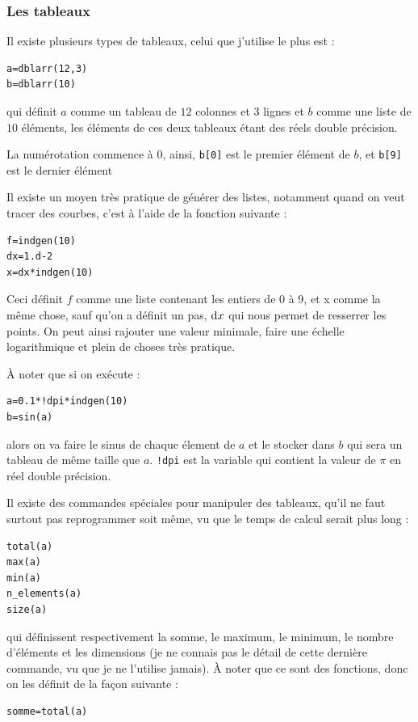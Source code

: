 \documentclass[a4paper,twoside]{article}
\begin{document}
\subsubsection{Les tableaux}
Il existe plusieurs types de tableaux, celui que j'utilise le plus est :
\begin{verbatim}
a=dblarr(12,3)
b=dblarr(10)
\end{verbatim}
qui définit $a$ comme un tableau de $12$ colonnes et $3$ lignes et $b$ comme une liste de $10$ éléments, les éléments de ces deux tableaux étant des réels double précision.

\begin{attention}
La numérotation commence à $0$, ainsi, \verb|b[0]| est le premier élément de $b$, et \verb|b[9]| est le dernier élément
\end{attention}

\bigskip

Il existe un moyen très pratique de générer des listes, notamment quand on veut tracer des courbes, c'est à l'aide de la fonction suivante :
\begin{verbatim}
f=indgen(10)
dx=1.d-2
x=dx*indgen(10)
\end{verbatim}

Ceci définit $f$ comme une liste contenant les entiers de $0$ à $9$, et x comme la même chose, sauf qu'on a définit un pas, $\operatorname{d \!} x$ qui nous permet de resserrer les points. On peut ainsi rajouter une valeur minimale, faire une échelle logarithmique et plein de choses très pratique.

\begin{remarque}
À noter que si on exécute :
\begin{verbatim}
a=0.1*!dpi*indgen(10)
b=sin(a)
\end{verbatim}
alors on va faire le sinus de chaque élement de $a$ et le stocker dans $b$ qui sera un tableau de même taille que $a$. \verb|!dpi| est la variable qui contient la valeur de $\pi$ en réel double précision.
\end{remarque}


\bigskip

Il existe des commandes spéciales pour manipuler des tableaux, qu'il ne faut surtout pas reprogrammer soit même, vu que le temps de calcul serait plus long :
\begin{verbatim}
total(a)
max(a)
min(a)
n_elements(a)
size(a)
\end{verbatim}
qui définissent respectivement la somme, le maximum, le minimum, le nombre d'éléments et les dimensions (je ne connais pas le détail de cette dernière commande, vu que je ne l'utilise jamais). À noter que ce sont des fonctions, donc on les définit de la façon suivante :
\begin{verbatim}
somme=total(a)
\end{verbatim}
\end{document}
